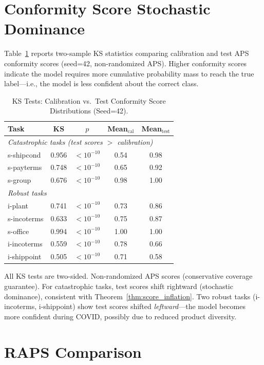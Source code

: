 \documentclass{uai2026} %
\begin{document}
\section{Conformity Score Stochastic Dominance}\label{app:ks}

Table~\ref{tab:ks} reports two-sample KS statistics comparing calibration and test APS conformity scores (seed=42, non-randomized APS). Higher conformity scores indicate the model requires more cumulative probability mass to reach the true label---i.e., the model is less confident about the correct class.

\begin{table}[htbp]
\centering
\caption{KS Tests: Calibration vs.\ Test Conformity Score Distributions (Seed=42).}\label{tab:ks}
\small
\begin{tabular}{@{}lcccc@{}}
\toprule
Task & KS & $p$ & Mean$_{\text{cal}}$ & Mean$_{\text{test}}$ \\
\midrule
\multicolumn{5}{l}{\textit{Catastrophic tasks (test scores $>$ calibration)}} \\
s-shipcond & 0.956 & $<10^{-10}$ & 0.54 & 0.98 \\
s-payterms & 0.748 & $<10^{-10}$ & 0.65 & 0.92 \\
s-group & 0.676 & $<10^{-10}$ & 0.98 & 1.00 \\
\midrule
\multicolumn{5}{l}{\textit{Robust tasks}} \\
i-plant & 0.741 & $<10^{-10}$ & 0.73 & 0.86 \\
s-incoterms & 0.633 & $<10^{-10}$ & 0.75 & 0.87 \\
s-office & 0.994 & $<10^{-10}$ & 1.00 & 1.00 \\
i-incoterms & 0.559 & $<10^{-10}$ & 0.78 & 0.66 \\
i-shippoint & 0.505 & $<10^{-10}$ & 0.71 & 0.58 \\
\bottomrule
\end{tabular}


\raggedright
\footnotesize
All KS tests are two-sided. Non-randomized APS scores (conservative coverage guarantee). For catastrophic tasks, test scores shift rightward (stochastic dominance), consistent with Theorem~\ref{thm:score_inflation}. Two robust tasks (i-incoterms, i-shippoint) show test scores shifted \textit{leftward}---the model becomes more confident during COVID, possibly due to reduced product diversity.
\end{table}

\section{RAPS Comparison}\label{app:raps}
\end{document}
